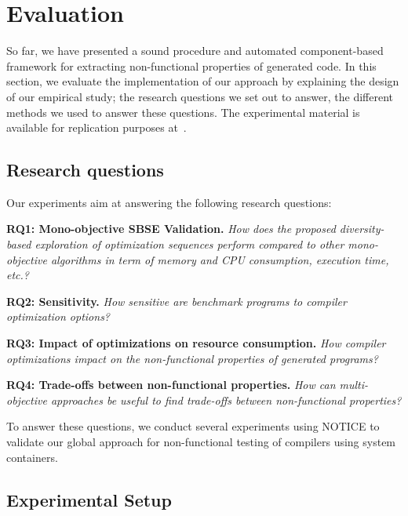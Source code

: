\section{Evaluation}
So far, we have presented a sound procedure and automated component-based framework for extracting non-functional properties of generated code. In this section, we evaluate the implementation of our approach by explaining the design of our empirical study; the research questions we set out to answer, the different methods we used to answer these questions. The experimental material is available for replication purposes at~\cite{mboussaa}.

\subsection{Research questions}
Our experiments aim at answering the following research questions:

\textbf{RQ1: Mono-objective SBSE Validation.} 
\textit{How does the proposed diversity-based exploration of optimization sequences perform compared to other mono-objective algorithms in term of memory and CPU consumption, execution time, etc.?} 
 

\textbf{RQ2: Sensitivity.} 
\textit{How sensitive are benchmark programs to compiler optimization options?}



\textbf{RQ3: Impact of optimizations on resource consumption.} 
\textit{How compiler optimizations impact on the non-functional properties of generated programs?}


\textbf{RQ4: Trade-offs between non-functional properties.} 
\textit{How can multi-objective approaches be useful to find trade-offs between non-functional properties?}

To answer these questions, we conduct several experiments using NOTICE to validate our global approach for non-functional testing of compilers using system containers.
 

\subsection{Experimental Setup}
